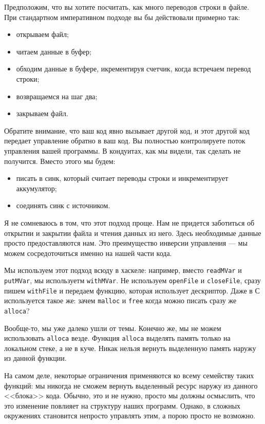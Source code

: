 {Предположим, что вы хотите посчитать, как много переводов строки в файле. При 
стандартном императивном подходе вы бы действовали примерно так:
\begin{itemize}  
\item   открываем файл;
\item   читаем данные в буфер;
\item   обходим данные в буфере, икрементируя счетчик, когда встречаем перевод строки;
\item   возвращаемся на шаг два;
\item   закрываем файл.
\end{itemize}
Обратите внимание, что ваш код явно вызывает другой код, и этот другой код 
передает управление обратно в ваш код. Вы полностью контролируете поток 
управления вашей программы. В кондуитах, как мы видели, так сделать 
не получится. Вместо этого мы будем:
\begin{itemize}
\item  писать в синк, который считает переводы строки и инкрементирует  аккумулятор;
\item  соединять синк с источником.
\end{itemize} 
Я не сомневаюсь в том, что этот подход проще. Нам не придется заботиться об 
открытии и закрытии файла и чтения данных из него. Здесь необходимые данные 
просто предоставляются нам. Это преимущество инверсии управления --- мы 
можем сосредоточиться именно на нашей части кода.

Мы используем этот подход всюду в хаскеле: например, вместо \lstinline'readMVar' 
и \lstinline'putMVar', мы используетм \lstinline'withMVar'. Не используем 
\lstinline'openFile' и \lstinline'closeFile', сразу пишем \lstinline'withFile' 
и передаем функцию, которая использует дескриптор. Даже в С используется такое 
же: зачем \lstinline'malloc' и \lstinline'free' когда можно писать сразу же
\lstinline'alloca'?

Вообще-то, мы уже далеко ушли от темы. Конечно же, мы не можем использовать 
\lstinline'alloca' везде. Функция \lstinline'alloca' выделять память только на 
локальном стеке, а не в куче. Никак нельзя вернуть выделенную память наружу из 
данной функции.

На самом деле, некоторые ограничения применяются ко всему семейству таких 
функций: мы никогда не сможем вернуть выделенный ресурс наружу из данного 
<<блока>> кода. Обычно, это и не нужно, просто мы должны осмыслить, что это 
изменение повлияет на структуру наших программ. Однако, в сложных окружениях 
становится непросто управлять этим, а порою просто не возможно. 

}
